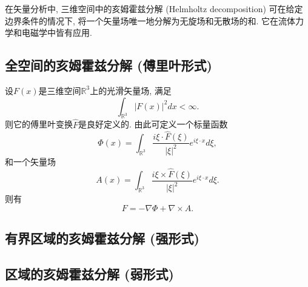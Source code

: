 
在矢量分析中, 三维空间中的亥姆霍兹分解 (Helmholtz decomposition) 可在给定边界条件的情况下, 将一个矢量场唯一地分解为无旋场和无散场的和. 它在流体力学和电磁学中皆有应用.

\subsection{全空间的亥姆霍兹分解 (傅里叶形式)}
设$F(x)$是三维空间$\mathbb{R}^3$上的光滑矢量场, 满足
$$
\int_{\mathbb{R}^3}|F(x)|^2dx<\infty.
$$
则它的傅里叶变换$\hat F$是良好定义的. 由此可定义一个标量函数
$$
\Phi(x)=\int_{\mathbb{R}^3}\frac{i\xi\cdot\hat F(\xi)}{|\xi|^2}e^{i\xi\cdot x}d\xi,
$$
和一个矢量场
$$
A(x)=\int_{\mathbb{R}^3}\frac{i\xi\times\hat F(\xi)}{|\xi|^2}e^{i\xi\cdot x}d\xi.
$$
则有
$$
F=-\nabla\Phi+\nabla\times A.
$$

\subsection{有界区域的亥姆霍兹分解 (强形式)}

\subsection{区域的亥姆霍兹分解 (弱形式)}

